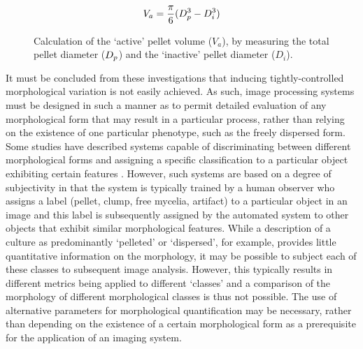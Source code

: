 \begin{figure}[tb]
	\centering
	$$V_a = \frac{\pi}{6}(D_p^3 - D_i^3)$$
	\caption{Calculation of the \lq active' pellet volume ($V_a$), by measuring the total pellet diameter ($D_p$) and the \lq inactive' pellet diameter ($D_i$).}
	\label{fig:PelletRegions}
\end{figure}


It must be concluded from these investigations that inducing tightly-controlled morphological variation is not easily achieved. As such, image processing systems must be designed in such a manner as to permit detailed evaluation of any morphological form that may result in a particular process, rather than relying on the existence of one particular phenotype, such as the freely dispersed form. Some studies have described systems capable of discriminating between different morphological forms and assigning a specific classification to a particular object exhibiting certain features \cite{treskatis1997,papagianni2006a}. However, such systems are based on a degree of subjectivity in that the system is typically trained by a human observer who assigns a label (pellet, clump, free mycelia, artifact) to a particular object in an image and this label is subsequently assigned by the automated system to other objects that exhibit similar morphological features. While a description of a culture as predominantly \lq pelleted' or \lq dispersed', for example, provides little quantitative information on the morphology, it may be possible to subject each of these classes to subsequent image analysis. However, this typically results in different metrics being applied to different \lq classes' and a comparison of the morphology of different morphological classes is thus not possible. The use of alternative parameters for morphological quantification may be necessary, rather than depending on the existence of a certain morphological form as a prerequisite for the application of an imaging system.

